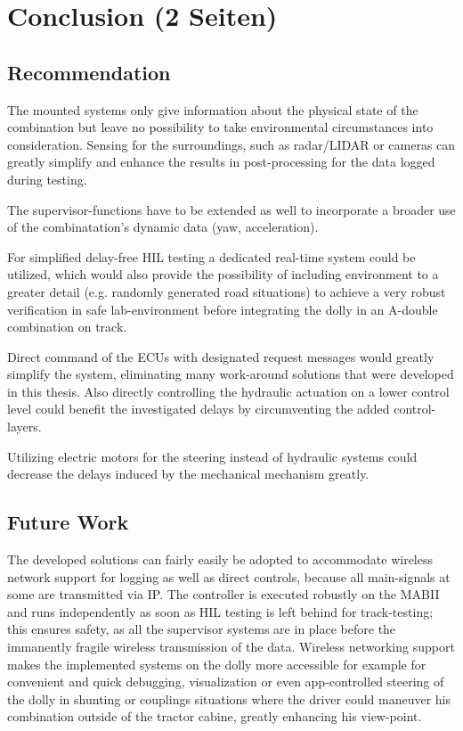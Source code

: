 \documentclass[ExampleMasters.tex]{subfiles}
\begin{document}
\clearpage
{\pagestyle{empty}\cleardoublepage}%
\chapter{Conclusion (2 Seiten)}
\label{chap:conclusion}

\section{Recommendation}
\label{sec:recommendation}

The mounted systems only give information about the physical state of the combination but leave no possibility to take environmental circumstances into consideration. Sensing for the surroundings, such as radar/LIDAR or cameras can greatly simplify and enhance the results in post-processing for the data logged during testing. 

The supervisor-functions have to be extended as well to incorporate a broader use of the combinatation's dynamic data (yaw, acceleration).  

For simplified delay-free \gls{HIL} testing a dedicated real-time system could be utilized, which would also provide the possibility of including environment to a greater detail (e.g. randomly generated road situations) to achieve a very robust verification in safe lab-environment before integrating the dolly in an A-double combination on track.

Direct command of the \gls{ECU}s with designated request messages would greatly simplify the system, eliminating many work-around solutions that were developed in this thesis. Also directly controlling the hydraulic actuation on a lower control level could benefit the investigated delays by circumventing the added control-layers.

Utilizing electric motors for the steering instead of hydraulic systems could decrease the delays induced by the mechanical mechanism greatly. 



\section{Future Work}
\label{sec:future_work}

The developed solutions can fairly easily be adopted to accommodate wireless network support for logging as well as direct controls, because all main-signals at some are transmitted via \gls{IP}. The controller is executed robustly on the \gls{MABII} and runs independently as soon as \gls{HIL} testing is left behind for track-testing; this ensures safety, as all the supervisor systems are in place before the immanently fragile wireless transmission of the data. Wireless networking support makes the implemented systems on the dolly more accessible for example for convenient and quick debugging, visualization or even app-controlled steering of the dolly in shunting or couplings situations where the driver could maneuver his combination outside of the tractor cabine, greatly enhancing his view-point.
\end{document}
